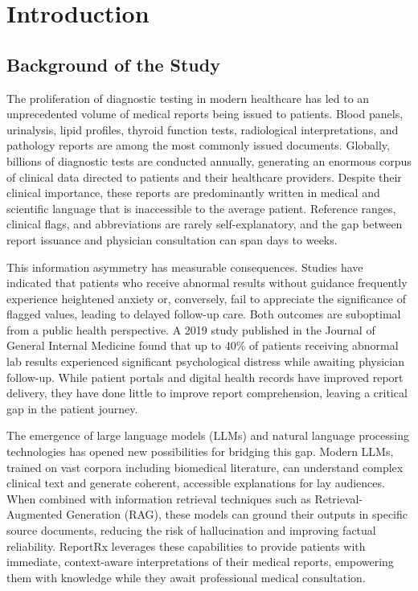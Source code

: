 \chapter{Introduction}

\section{Background of the Study}
The proliferation of diagnostic testing in modern healthcare has led to an unprecedented volume of medical reports being issued to patients. Blood panels, urinalysis, lipid profiles, thyroid function tests, radiological interpretations, and pathology reports are among the most commonly issued documents. Globally, billions of diagnostic tests are conducted annually, generating an enormous corpus of clinical data directed to patients and their healthcare providers. Despite their clinical importance, these reports are predominantly written in medical and scientific language that is inaccessible to the average patient. Reference ranges, clinical flags, and abbreviations are rarely self-explanatory, and the gap between report issuance and physician consultation can span days to weeks.

This information asymmetry has measurable consequences. Studies have indicated that patients who receive abnormal results without guidance frequently experience heightened anxiety or, conversely, fail to appreciate the significance of flagged values, leading to delayed follow-up care. Both outcomes are suboptimal from a public health perspective. A 2019 study published in the Journal of General Internal Medicine found that up to 40\% of patients receiving abnormal lab results experienced significant psychological distress while awaiting physician follow-up. While patient portals and digital health records have improved report delivery, they have done little to improve report comprehension, leaving a critical gap in the patient journey.

The emergence of large language models (LLMs) and natural language processing technologies has opened new possibilities for bridging this gap. Modern LLMs, trained on vast corpora including biomedical literature, can understand complex clinical text and generate coherent, accessible explanations for lay audiences. When combined with information retrieval techniques such as Retrieval-Augmented Generation (RAG), these models can ground their outputs in specific source documents, reducing the risk of hallucination and improving factual reliability. ReportRx leverages these capabilities to provide patients with immediate, context-aware interpretations of their medical reports, empowering them with knowledge while they await professional medical consultation.

